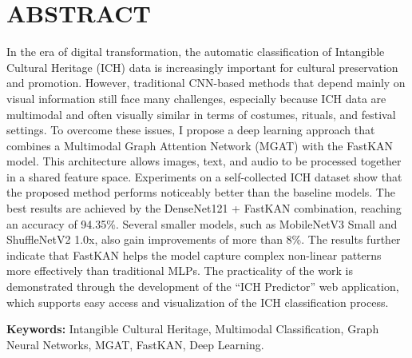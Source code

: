 \chapter{ABSTRACT}

\indent\indent In the era of digital transformation, the automatic classification of Intangible Cultural Heritage (ICH) data is increasingly important for cultural preservation and promotion. However, traditional CNN-based methods that depend mainly on visual information still face many challenges, especially because ICH data are multimodal and often visually similar in terms of costumes, rituals, and festival settings. To overcome these issues, I propose a deep learning approach that combines a Multimodal Graph Attention Network (MGAT) with the FastKAN model. This architecture allows images, text, and audio to be processed together in a shared feature space. Experiments on a self-collected ICH dataset show that the proposed method performs noticeably better than the baseline models. The best results are achieved by the DenseNet121 + FastKAN combination, reaching an accuracy of 94.35\%. Several smaller models, such as MobileNetV3 Small and ShuffleNetV2 1.0x, also gain improvements of more than 8\%. The results further indicate that FastKAN helps the model capture complex non-linear patterns more effectively than traditional MLPs. The practicality of the work is demonstrated through the development of the “ICH Predictor” web application, which supports easy access and visualization of the ICH classification process.\vspace{0.3cm}

\textbf{Keywords:} Intangible Cultural Heritage, Multimodal Classification, Graph Neural Networks, MGAT, FastKAN, Deep Learning.